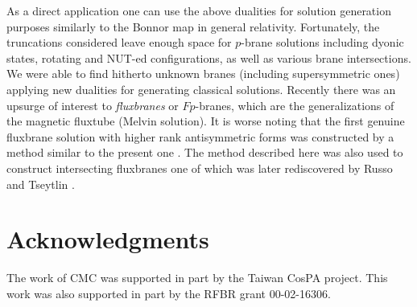 \documentclass[a4paper,12pt]{article}
\begin{document}
As a direct application one can use the above dualities  for
solution generation purposes similarly to the Bonnor map in
general relativity. Fortunately, the truncations considered
leave enough space for $p$-brane solutions including dyonic
states, rotating and NUT-ed configurations, as well as various
brane intersections. We were able to find hitherto unknown
branes (including supersymmetric ones) applying new dualities
for generating classical solutions. Recently there was an
upsurge of interest to  {\em fluxbranes} or $Fp$-branes, which
are the generalizations of the magnetic fluxtube (Melvin
solution). It is worse noting that the first genuine fluxbrane
solution with higher rank antisymmetric forms was constructed
by a method similar to the present one \cite{GaRy98}. The method
described here was also used to  construct  intersecting
fluxbranes  \cite{ChGaSh99}   one of which  was later
rediscovered  by Russo and Tseytlin \cite{RuTs01,Ts01}.


\section*{Acknowledgments}
The work of CMC was supported in part by the Taiwan CosPA
project. This work was also supported in part by the RFBR grant
00-02-16306.
\end{document}
